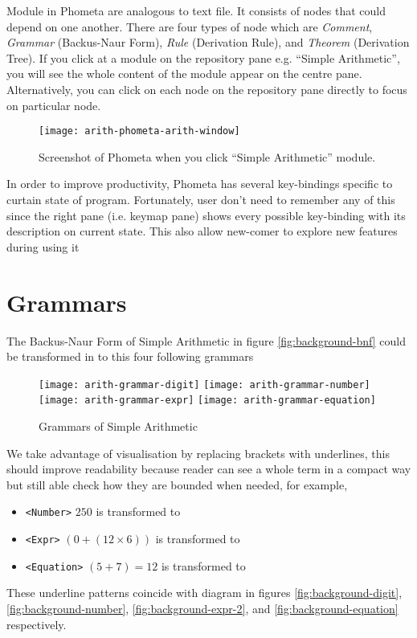 \documentclass[master.tex]{subfiles}
\begin{document}
Module in Phometa are analogous to text file. It consists of nodes that could
depend on one another. There are four types of node which are \emph{Comment},
\emph{Grammar} (Backus-Naur Form), \emph{Rule} (Derivation Rule), and
\emph{Theorem} (Derivation Tree). If you click at a module on the repository
pane e.g. ``Simple Arithmetic'', you will see the whole content of the module
appear on the centre pane. Alternatively, you can click on each node on the
repository pane directly to focus on particular node.

\begin{figure}[H]
    \centering
    \texttt{[image: arith-phometa-arith-window]}
    \caption{Screenshot of Phometa when you click ``Simple Arithmetic'' module.}
\label{fig:arith-phometa-arith-window}
\end{figure}

In order to improve productivity, Phometa has several key-bindings specific to
curtain state of program. Fortunately, user don't need to remember any of this
since the right pane (i.e. keymap pane) shows every possible key-binding with
its description on current state. This also allow new-comer to explore new
features during using it

\section{Grammars}

The Backus-Naur Form of Simple Arithmetic in figure \ref{fig:background-bnf}
could be transformed in to this four following grammars
\begin{figure}[H]
    \centering
\begin{minipage}{0.7\textwidth}
    \texttt{[image: arith-grammar-digit]}
    \texttt{[image: arith-grammar-number]}
    \texttt{[image: arith-grammar-expr]}
    \texttt{[image: arith-grammar-equation]}
\end{minipage}

    \caption{Grammars of Simple Arithmetic}
\label{fig:arith-grammars}
\end{figure}

We take advantage of visualisation by replacing brackets with underlines, this
should improve readability because reader can see a whole term in a compact
way but still able check how they are bounded when needed, for example,
\begin{itemize}
\item \texttt{<Number>} $250$ is transformed to
   
\item \texttt{<Expr>} $(0 + (12 \times 6))$ is transformed to
   
\item \texttt{<Equation>} $(5 + 7) = 12$ is transformed to
   
\end{itemize}
These underline patterns coincide with diagram in figures \ref{fig:background-digit},
\ref{fig:background-number}, \ref{fig:background-expr-2}, and
\ref{fig:background-equation} respectively.
\end{document}

